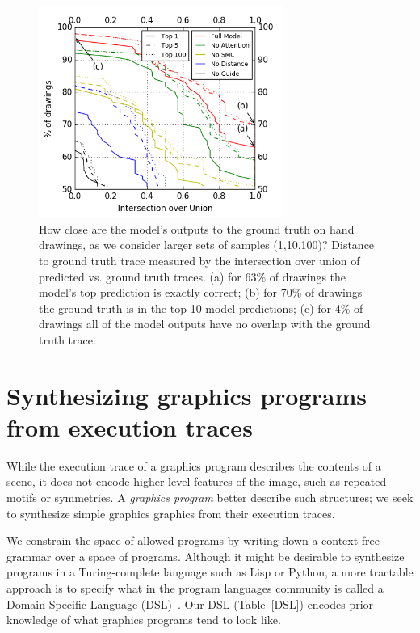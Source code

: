 \documentclass{article}
\begin{document}
\begin{figure}[h]\centering
  \begin{minipage}{0.8\textwidth} 
\centering  \includegraphics[width = 8cm]{figures/drawingAccuracy.png} 
  \caption{How close are the model's outputs to the ground truth on hand drawings, as we consider larger sets of samples (1,10,100)?
    Distance to ground truth trace measured by the intersection over union of predicted vs. ground truth traces. (a) for 63\% of drawings the model's top prediction is exactly correct; (b) for 70\% of drawings the ground truth is in the top 10 model predictions; (c) for 4\% of drawings all of the model outputs have no overlap with the ground truth trace.}\label{drawingIntersectionOverUnion}
    \end{minipage}
\end{figure}





\section{Synthesizing graphics programs from execution traces}\label{programSynthesisSection}
While the execution trace of a graphics program describes the contents
of a scene, it does not encode higher-level features of the image,
such as repeated motifs or symmetries.  A \emph{graphics
  program} better describe such structures;
we seek to synthesize simple graphics graphics from their execution traces.

We constrain the space of allowed programs by writing down a context
free grammar over a space of programs. Although it might be desirable
to synthesize programs in a Turing-complete language such as Lisp or
Python, a more tractable approach is to specify what in the program
languages community is called a Domain Specific Language (DSL)~\cite{polozov2015flashmeta}. Our DSL (Table~\ref{DSL})
encodes prior knowledge of what graphics programs tend to look like.
\end{document}

